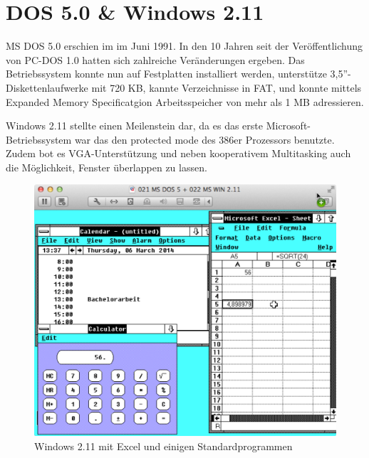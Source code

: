 \newpage

\section{DOS 5.0 \& Windows 2.11}

	MS DOS 5.0 erschien im im Juni 1991.
	In den 10 Jahren seit der Veröffentlichung von PC-DOS 1.0 hatten sich zahlreiche Veränderungen ergeben. 
	Das Betriebssystem konnte nun auf Festplatten installiert werden, unterstütze 3,5''-Diskettenlaufwerke mit 720 KB, kannte Verzeichnisse in FAT, und konnte mittels Expanded Memory Specificatgion Arbeitsspeicher von mehr als 1 MB adressieren. 

	Windows 2.11 stellte einen Meilenstein dar, da es das erste Microsoft-Betriebssystem war das den protected mode des 386er Prozessors benutzte. Zudem bot es VGA-Unterstützung und neben kooperativem Multitasking auch die Möglichkeit, Fenster überlappen zu lassen.

	\begin{figure}[h]
		\begin{center}
			\includegraphics[width=\textwidth]{img/WIN211_2}
			\caption{Windows 2.11 mit Excel und einigen Standardprogrammen}
			\label{fig:screenshot-win211excel}
		\end{center}
	\end{figure}

